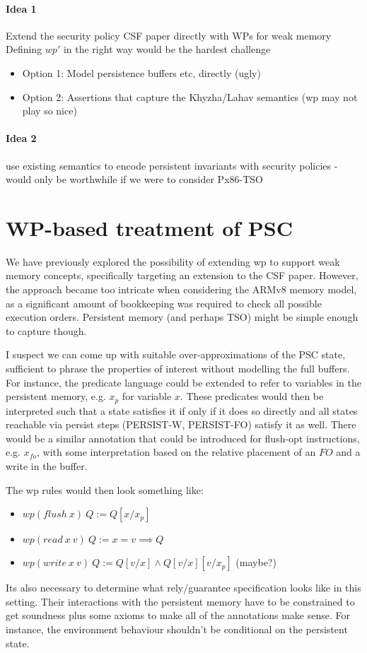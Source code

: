 \paragraph{Idea 1} Extend the security policy CSF paper directly with WPs for weak memory
Defining $wp'$ in the right way would be the hardest challenge
\begin{itemize}
\item Option 1: Model persistence buffers etc, directly (ugly)
\item Option 2: Assertions that capture the Khyzha/Lahav semantics (wp may not play so nice) 
\end{itemize}

\paragraph{Idea 2} use existing semantics to encode persistent invariants with security policies
- would only be worthwhile if we were to consider Px86-TSO

\section{WP-based treatment of PSC} 

We have previously explored the possibility of extending wp to support weak memory concepts, specifically targeting an extension to the CSF paper. However, the approach became too intricate when considering the ARMv8 memory model, as a significant amount of bookkeeping was required to check all possible execution orders. Persistent memory (and perhaps TSO) might be simple enough to capture though.

I suspect we can come up with suitable over-approximations of the PSC state, sufficient to phrase the properties of interest without modelling the full buffers. For instance, the predicate language could be extended to refer to variables in the persistent memory, e.g. $x_p$ for variable $x$. These predicates would then be interpreted such that a state satisfies it if only if it does so directly and all states reachable via persist steps (PERSIST-W, PERSIST-FO) satisfy it as well. There would be a similar annotation that could be introduced for flush-opt instructions, e.g. $x_{fo}$, with some interpretation based on the relative placement of an $FO$ and a write in the buffer.

The wp rules would then look something like:

\begin{itemize}
\item $wp(flush~x)~Q := Q[x/x_p]$
\item $wp(read~x~v)~Q := x = v \implies Q$ 
\item $wp(write~x~v)~Q := Q[v/x] \land Q[v/x][v/x_p]$ (maybe?)
\end{itemize}
Its also necessary to determine what rely/guarantee specification looks like in this setting. Their interactions with the persistent memory have to be constrained to get soundness plus some axioms to make all of the annotations make sense. For instance, the environment behaviour shouldn't be conditional on the persistent state.

